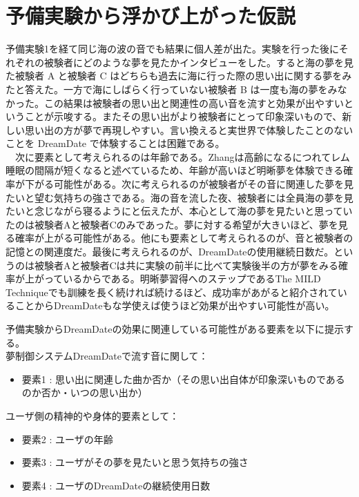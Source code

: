 \section{予備実験から浮かび上がった仮説}
予備実験1を経て同じ海の波の音でも結果に個人差が出た。実験を行った後にそれぞれの被験者にどのような夢を見たかインタビューをした。すると海の夢を見た被験者 A と被験者 C はどちらも過去に海に行った際の思い出に関する夢をみたと答えた。一方で海にしばらく行っていない被験者 B は一度も海の夢をみなかった。この結果は被験者の思い出と関連性の高い音を流すと効果が出やすいということが示唆する。またその思い出がより被験者にとって印象深いもので、新しい思い出の方が夢で再現しやすい。言い換えると実世界で体験したことのないことを DreamDate で体験することは困難である。\\
　次に要素として考えられるのは年齢である。Zhangは高齢になるにつれてレム睡眠の間隔が短くなると述べているため、年齢が高いほど明晰夢を体験できる確率が下がる可能性がある\cite{Zhang}。次に考えられるのが被験者がその音に関連した夢を見たいと望む気持ちの強さである。海の音を流した夜、被験者には全員海の夢を見たいと念じながら寝るようにと伝えたが、本心として海の夢を見たいと思っていたのは被験者Aと被験者Cのみであった。夢に対する希望が大きいほど、夢を見る確率が上がる可能性がある。他にも要素として考えられるのが、音と被験者の記憶との関連度だ。最後に考えられるのが、DreamDateの使用継続日数だ。というのは被験者Aと被験者Cは共に実験の前半に比べて実験後半の方が夢をみる確率が上がっているからである。明晰夢習得へのステップであるThe MILD Techniqueでも訓練を長く続ければ続けるほど、成功率があがると紹介されていることからDreamDateもな学使えば使うほど効果が出やすい可能性が高い\cite{LaBerge}。

予備実験からDreamDateの効果に関連している可能性がある要素を以下に提示する。\\
夢制御システムDreamDateで流す音に関して：
\begin{itemize}
\item 要素1 : 思い出に関連した曲か否か（その思い出自体が印象深いものであるのか否か・いつの思い出か）
\end{itemize}
ユーザ側の精神的や身体的要素として：
\begin{itemize}
\item 要素2 : ユーザの年齢
\item 要素3 : ユーザがその夢を見たいと思う気持ちの強さ
\item 要素4 : ユーザのDreamDateの継続使用日数
\end{itemize}

